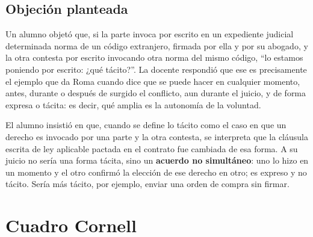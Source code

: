 \documentclass[12pt,oneside]{book}
\begin{document}
\subsection{Objeci\'on planteada}

Un alumno objet\'o que, si la parte invoca por escrito en un expediente judicial determinada norma de un c\'odigo extranjero, firmada por ella y por su abogado, y la otra contesta por escrito invocando otra norma del mismo c\'odigo, ``lo estamos poniendo por escrito: ¿qu\'e t\'acito?''. La docente respondi\'o que ese es precisamente el ejemplo que da Roma cuando dice que se puede hacer en cualquier momento, antes, durante o despu\'es de surgido el conflicto, aun durante el juicio, y de forma expresa o t\'acita: es decir, qu\'e amplia es la autonom\'ia de la voluntad.

El alumno insisti\'o en que, cuando se define lo t\'acito como el caso en que un derecho es invocado por una parte y la otra contesta, se interpreta que la cl\'ausula escrita de ley aplicable pactada en el contrato fue cambiada de esa forma. A su juicio no ser\'ia una forma t\'acita, sino un \textbf{acuerdo no simult\'aneo}: uno lo hizo en un momento y el otro confirm\'o la elecci\'on de ese derecho en otro; es expreso y no t\'acito. Ser\'ia m\'as t\'acito, por ejemplo, enviar una orden de compra sin firmar.

\section{Cuadro Cornell}
\end{document}
